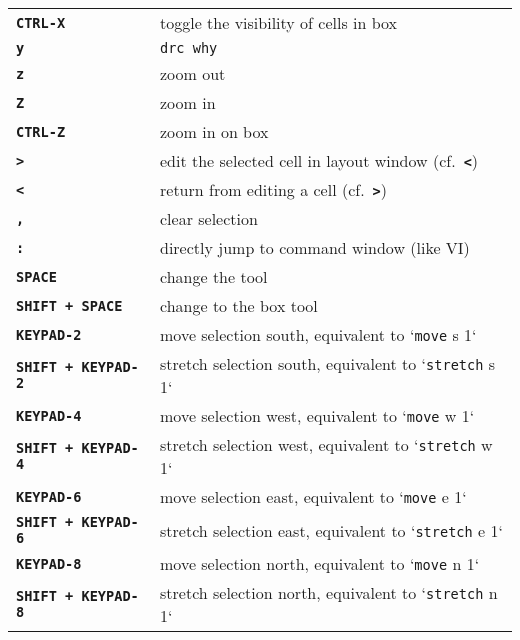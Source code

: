 \documentclass[10pt,a4paper]{article}
\newcommand{\key}[1]{\texttt{\textbf{#1}}}
\newcommand{\mac}[1]{\texttt{#1}}
\begin{document}
\begin{tabular}{p{}p{}}
		\key{CTRL-X} & toggle the visibility of cells in box\\
		\key{y} & \mac{drc why}\\
		\key{z} & zoom out\\
		\key{Z} & zoom in\\
		\key{CTRL-Z} & zoom in on box\\
		\key{>} & edit the selected cell in layout window (cf.~\key{<})\\
		\key{<} & return from editing a cell (cf.~\key{>})\\
		\key{,} & clear selection\\
		\key{:} & directly jump to command window (like VI)\\
		\key{SPACE} & change the tool\\
		\key{SHIFT + SPACE} & change to the box tool\\
		\key{KEYPAD-2} & move selection south, equivalent to `\mac{move} s 1`\\
		\key{SHIFT + KEYPAD-2} & stretch selection south, equivalent to `\mac{stretch} s 1`\\
		\key{KEYPAD-4} & move selection west, equivalent to `\mac{move} w 1`\\
		\key{SHIFT + KEYPAD-4} & stretch selection west, equivalent to `\mac{stretch} w 1`\\
		\key{KEYPAD-6} & move selection east, equivalent to `\mac{move} e 1` \\
		\key{SHIFT + KEYPAD-6} & stretch selection east, equivalent to `\mac{stretch} e 1`\\
		\key{KEYPAD-8} & move selection north, equivalent to `\mac{move} n 1` \\
		\key{SHIFT + KEYPAD-8} & stretch selection north, equivalent to `\mac{stretch} n 1`\\
		\bottomrule
	\end{tabular}

	\newpage
	
\end{document}
